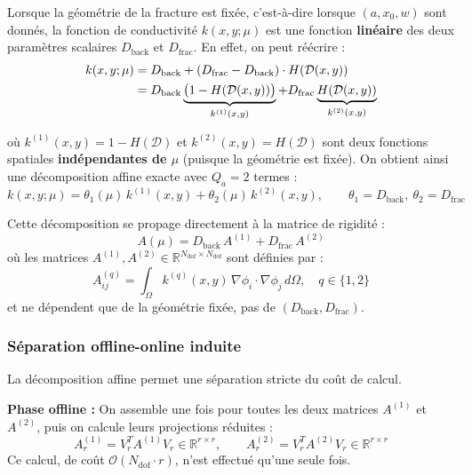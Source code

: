 \documentclass[12pt,a4paper]{article}
\begin{document}
Lorsque la géométrie de la fracture est fixée, c'est-à-dire lorsque $(a, x_0, w)$ sont donnés, la fonction de conductivité $k(x, y; \mu)$ est une fonction \textbf{linéaire} des deux paramètres scalaires $D_{\text{back}}$ et $D_{\text{frac}}$. En effet, on peut réécrire :
\begin{align}
    k(x, y; \mu) &= D_{\text{back}} + (D_{\text{frac}} - D_{\text{back}}) \cdot H(\mathcal{D}(x, y)) \notag \\
                 &= D_{\text{back}} \underbrace{\bigl(1 - H(\mathcal{D}(x, y))\bigr)}_{k^{(1)}(x,y)}
                  + D_{\text{frac}} \underbrace{H(\mathcal{D}(x, y))}_{k^{(2)}(x,y)}
\end{align}
 
où $k^{(1)}(x,y) = 1 - H(\mathcal{D})$ et $k^{(2)}(x,y) = H(\mathcal{D})$ sont deux fonctions spatiales \textbf{indépendantes de $\mu$} (puisque la géométrie est fixée). On obtient ainsi une décomposition affine exacte avec $Q_a = 2$ termes :
\begin{equation*}
    k(x, y; \mu) = \theta_1(\mu)\, k^{(1)}(x,y) + \theta_2(\mu)\, k^{(2)}(x,y), \qquad \theta_1 = D_{\text{back}},\ \theta_2 = D_{\text{frac}}
\end{equation*}
 
Cette décomposition se propage directement à la matrice de rigidité :
\begin{equation*}
    A(\mu) = D_{\text{back}}\, A^{(1)} + D_{\text{frac}}\, A^{(2)}
\end{equation*}
où les matrices $A^{(1)}, A^{(2)} \in \mathbb{R}^{N_{\text{dof}} \times N_{\text{dof}}}$ sont définies par :
\begin{equation*}
    A^{(q)}_{ij} = \int_{\Omega} k^{(q)}(x,y)\, \nabla\phi_i \cdot \nabla\phi_j\, d\Omega, \quad q \in \{1, 2\}
\end{equation*}
et ne dépendent que de la géométrie fixée, pas de $(D_{\text{back}}, D_{\text{frac}})$.
 
\subsubsection{Séparation offline-online induite}
 
La décomposition affine permet une séparation stricte du coût de calcul.
 
\textbf{Phase offline :} On assemble une fois pour toutes les deux matrices $A^{(1)}$ et $A^{(2)}$, puis on calcule leurs projections réduites :
\begin{equation*}
    A_r^{(1)} = V_r^T A^{(1)} V_r \in \mathbb{R}^{r \times r}, \qquad A_r^{(2)} = V_r^T A^{(2)} V_r \in \mathbb{R}^{r \times r}
\end{equation*}
Ce calcul, de coût $\mathcal{O}(N_{\text{dof}} \cdot r)$, n'est effectué qu'une seule fois.
 
\end{document}
